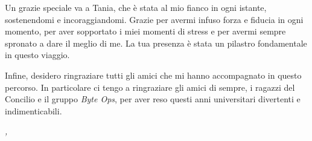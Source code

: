 \vspace{10pt}
\noindent Un grazie speciale va a Tania, che è stata al mio fianco in ogni istante, sostenendomi e incoraggiandomi. Grazie per avermi infuso forza e fiducia in ogni momento, per aver sopportato i miei momenti di stress e per avermi sempre spronato a dare il meglio di me. La tua presenza è stata un pilastro fondamentale in questo viaggio.

\vspace{10pt}
\noindent Infine, desidero ringraziare tutti gli amici che mi hanno accompagnato in questo percorso. In particolare ci tengo a ringraziare gli amici di sempre, i ragazzi del Concilio e il gruppo \textit{Byte Ops}, per aver reso questi anni universitari divertenti e indimenticabili.

\vspace{10pt}
\noindent\textit{\myLocation, \myTime}
\hfill \textit{\myName}

\endgroup
